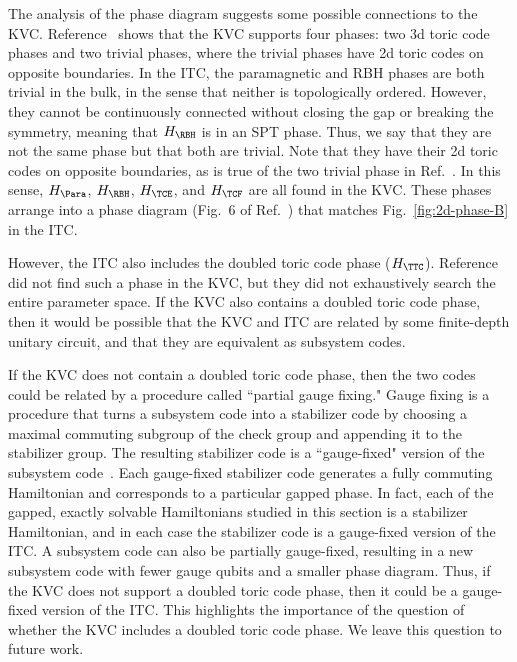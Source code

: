 The analysis of the phase diagram suggests some possible connections to the KVC.
Reference~\cite{Li2023PhaseDiagram} shows that the KVC supports four phases: two 3d toric code phases and two trivial phases, where the trivial phases have 2d toric codes on opposite boundaries.
In the ITC, the paramagnetic and RBH phases are both trivial in the bulk, in the sense that neither is topologically ordered. However, they cannot be continuously connected without closing the gap or breaking the symmetry, meaning that $H_\RBH$ is in an SPT phase. Thus, we say that they are not the same phase but that both are trivial. Note that they have their 2d toric codes on opposite boundaries, as is true of the two trivial phase in Ref.~\cite{Li2023PhaseDiagram}. In this sense, $H_\Para$, $H_\RBH$, $H_\TCE$, and $H_\TCF$ are all found in the KVC. These phases arrange into a phase diagram (Fig.~6 of Ref.~\cite{Li2023PhaseDiagram}) that matches Fig.~\ref{fig:2d-phase-B} in the ITC.

However, the ITC also includes the doubled toric code phase ($H_\TTC$). Reference~\cite{Li2023PhaseDiagram} did not find such a phase in the KVC, but they did not exhaustively search the entire parameter space. If the KVC also contains a doubled toric code phase, then it would be possible that the KVC and ITC are related by some finite-depth unitary circuit, and that they are equivalent as subsystem codes.

If the KVC does not contain a doubled toric code phase, then the two codes could be related by a procedure called ``partial gauge fixing." 
Gauge fixing is a procedure that turns a subsystem code into a stabilizer code by choosing a maximal commuting subgroup of the check group and appending it to the stabilizer group. The resulting stabilizer code is a ``gauge-fixed" version of the subsystem code~\cite{Paetznick2013Universal, Bombin2015Gauge}. Each gauge-fixed stabilizer code generates a fully commuting Hamiltonian and corresponds to a particular gapped phase. 
In fact, each of the gapped, exactly solvable Hamiltonians studied in this section is a stabilizer Hamiltonian, and in each case the stabilizer code is a gauge-fixed version of the ITC. A subsystem code can also be partially gauge-fixed, resulting in a new subsystem code with fewer gauge qubits and a smaller phase diagram. Thus, if the KVC does not support a doubled toric code phase, then it could be a gauge-fixed version of the ITC. This highlights the importance of the question of whether the KVC includes a doubled toric code phase. We leave this question to future work. 

